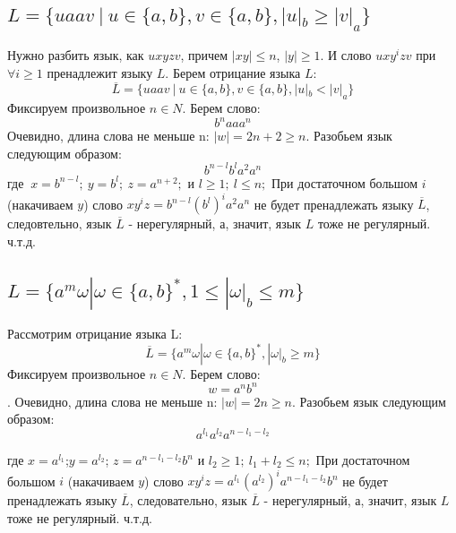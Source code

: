 \documentclass[a4paper,12pt]{article}
\begin{document}
\subsection{$L = \{uaav\:|\:u \in\{a,b\},v \in\{a,b\},|u|_b \geq|v|_a\}$}\newline
Нужно разбить язык, как $uxyzv$, причем $|xy| \leq n$, $|y| \geq 1$.\newline
И слово $uxy^izv$ при $\forall i \geq 1$ пренадлежит языку $L$.\newline
Берем отрицание языка $L$:\newline
$$\overline{L} = \{uaav\:|\:u \in\{a,b\},v \in\{a,b\},|u|_b <|v|_a\} $$\newline
Фиксируем произвольное $n\in N$.\newline
Берем слово:\newline
$$b^naaa^n$$ 
Очевидно, длина слова не меньше n: $|w|=2n+2\geq n$.\newline
Разобьем язык следующим образом:\newline
$$b^{n-l}b^la^{2}a^n$$\newline
где $\:x=b^{n-l};\:y = b^l;\:z = a^{n+2};$ и  $ l \geq 1;\:l \leq n; $\newline
При достаточном большом $i$ (накачиваем $y$) слово $xy^iz = b^{n-l}(b^{l})^ia^{2}a^n $ не будет пренадлежать языку $\overline{L}$, следовтельно, язык  $\overline{L}$ - нерегулярный, а, значит, язык $L$ тоже не регулярный.\newline
ч.т.д.
\subsection{$L=\{a^m\omega | \omega \in \{a,b\}^*, 1\leq |\omega|_b\leq m\}$}
Рассмотрим отрицание языка L:\newline $$\overline{L}=\{a^m\omega | \omega \in \{a,b\}^*, |\omega|_b\geq m\}$$
\newline
Фиксируем произвольное $n\in N$. \newline Берем слово:\newline $$w = a^nb^n$$.
\newline
Очевидно, длина слова не меньше n: $|w|=2n\geq n$.
\newline
Разобьем язык следующим образом:\newline
    $$a^{l_1}a^{l_2}a^{n-l_1-l_2}$$ 
    
    где $x=a^{l_1}$;\:$y=a^{l_2}$;\: $z=a^{n-l_1-l_2}b^n$ и $l_2 \geq 1;\:l_1 + l_2 \leq n;$\newline
При достаточном большом $i$ (накачиваем $y$) слово $xy^iz = a^{l_1}(a^{l_2})^ia^{n-l_1-l_2}b^n $ не будет пренадлежать языку $\overline{L}$, следовательно, язык  $\overline{L}$ - нерегулярный, а, значит, язык $L$ тоже не регулярный.\newline
ч.т.д.
\end{document}
